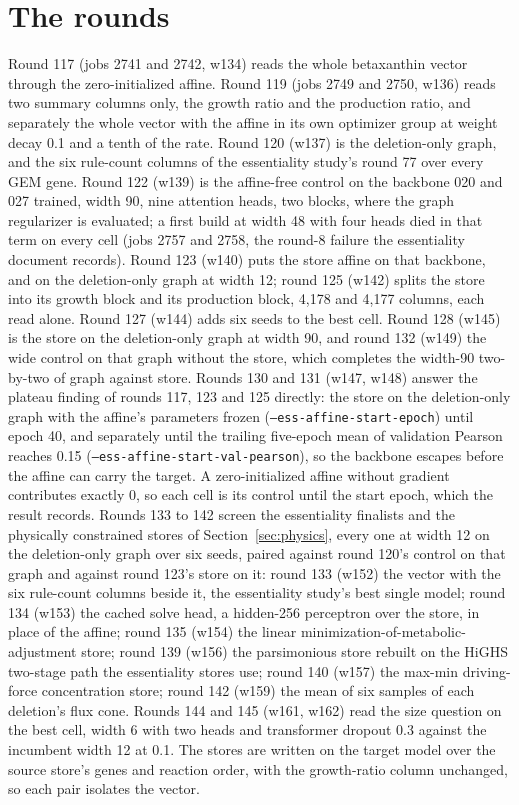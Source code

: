 \section{The rounds}
\label{sec:rounds}

Round 117 (jobs 2741 and 2742, w134) reads the whole betaxanthin vector through the
zero-initialized affine. Round 119 (jobs 2749 and 2750, w136) reads two summary columns
only, the growth ratio and the production ratio, and separately the whole vector with
the affine in its own optimizer group at weight decay 0.1 and a tenth of the rate. Round
120 (w137) is the deletion-only graph, and the six rule-count columns of the
essentiality study's round 77 over every GEM gene. Round 122 (w139) is the affine-free
control on the backbone 020 and 027 trained, width 90, nine attention heads, two
blocks, where the graph regularizer is evaluated; a first build at width 48 with four
heads died in that term on every cell (jobs 2757 and 2758, the round-8 failure the
essentiality document records). Round 123 (w140) puts the store affine on that backbone,
and on the deletion-only graph at width 12; round 125 (w142) splits the store into its
growth block and its production block, 4,178 and 4,177 columns, each read alone. Round
127 (w144) adds six seeds to the best cell. Round 128 (w145) is the store on the
deletion-only graph at width 90, and round 132 (w149) the wide control on that graph
without the store, which completes the width-90 two-by-two of graph against store.
Rounds 130 and 131 (w147, w148) answer the plateau finding of rounds 117, 123 and 125
directly: the store on the deletion-only graph with the affine's parameters frozen
(\texttt{--ess-affine-start-epoch}) until epoch 40, and separately until the trailing
five-epoch mean of validation Pearson reaches 0.15
(\texttt{--ess-affine-start-val-pearson}), so the backbone escapes before the affine can
carry the target. A zero-initialized affine without gradient contributes exactly 0, so
each cell is its control until the start epoch, which the result records. Rounds 133 to
142 screen the essentiality finalists and the physically constrained stores of
Section~\ref{sec:physics}, every one at width 12 on the deletion-only graph over six
seeds, paired against round 120's control on that graph and against round 123's store on
it: round 133 (w152) the vector with the six rule-count columns beside it, the
essentiality study's best single model; round 134 (w153) the cached solve head, a
hidden-256 perceptron over the store, in place of the affine; round 135 (w154) the linear
minimization-of-metabolic-adjustment store; round 139 (w156) the parsimonious store
rebuilt on the HiGHS two-stage path the essentiality stores use; round 140 (w157) the
max-min driving-force concentration store; round 142 (w159) the mean of six samples of
each deletion's flux cone. Rounds 144 and 145 (w161, w162) read the size question on the
best cell, width 6 with two heads and transformer dropout 0.3 against the incumbent
width 12 at 0.1. The stores are written on the target model over the source store's
genes and reaction order, with the growth-ratio column unchanged, so each pair isolates
the vector.

